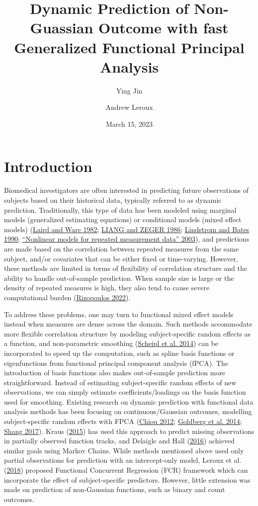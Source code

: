 \documentclass[
  11pt,
]{article}
\title{Dynamic Prediction of Non-Guassian Outcome with fast Generalized
Functional Principal Analysis}
\author{Ying Jin \and Andrew Leroux}
\date{March 15, 2023}
\begin{document}
\maketitle

\hypertarget{introduction}{%
\section{Introduction}\label{introduction}}

Biomedical investigators are often interested in predicting future
observations of subjects based on their historical data, typically
referred to as dynamic prediction. Traditionally, this type of data has
been modeled using marginal models (generalized estimating equations) or
conditional models (mixed effect models)
(\protect\hyperlink{ref-Laird1982}{Laird and Ware 1982};
\protect\hyperlink{ref-liang1986}{LIANG and ZEGER 1986};
\protect\hyperlink{ref-lindstrom1990}{Lindstrom and Bates 1990};
\protect\hyperlink{ref-davidian2003}{{``Nonlinear models for repeated
measurement data''} 2003}), and predictions are made based on the
correlation between repeated measures from the same subject, and/or
covariates that can be either fixed or time-varying. However, these
methods are limited in terms of flexibility of correlation structure and
the ability to handle out-of-sample prediction. When sample size is
large or the density of repeated measures is high, they also tend to
cause severe computational burden
(\protect\hyperlink{ref-GLMMadaptive}{Rizopoulos 2022}).

To address these problems, one may turn to functional mixed effect
models instead when measures are dense across the domain. Such methods
accommodate more flexible correlation structure by modeling
subject-specific random effects as a function, and non-parametric
smoothing (\protect\hyperlink{ref-Scheipl2014}{Scheipl et al. 2014}) can
be incorporated to speed up the computation, such as spline basis
functions or eigenfunctions from functional principal component analysis
(fPCA). The introduction of basis functions also makes out-of-sample
prediction more straightforward. Instead of estimating subject-specific
random effects of new observations, we can simply estimate
coefficients/loadings on the basis function used for smoothing. Existing
research on dynamic prediction with functional data analysis methods has
been focusing on continuous/Gaussian outcomes, modelling
subject-specific random effects with FPCA
(\protect\hyperlink{ref-chiou2012}{Chiou 2012};
\protect\hyperlink{ref-goldberg2014}{Goldberg et al. 2014};
\protect\hyperlink{ref-shang2017}{Shang 2017}). Kraus
(\protect\hyperlink{ref-kraus2015}{2015}) has used this approach to
predict missing observations in partially observed function tracks, and
Delaigle and Hall (\protect\hyperlink{ref-delaigo2016}{2016}) achieved
similar goals using Markov Chains. While methods mentioned above used
only partial observations for prediction with an intercept-only model,
Leroux et al. (\protect\hyperlink{ref-leroux2016}{2018}) proposed
Functional Concurrent Regression (FCR) framework which can incorporate
the effect of subject-specific predictors. However, little extension was
made on prediction of non-Gaussian functions, such as binary and count
outcomes.
\end{document}
